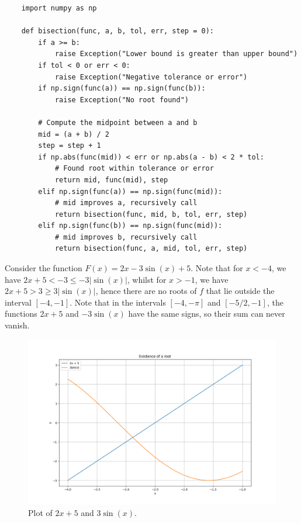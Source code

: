 \documentclass{article}
\begin{document}
\begin{verbatim}
    import numpy as np
        
    def bisection(func, a, b, tol, err, step = 0):
        if a >= b:
            raise Exception("Lower bound is greater than upper bound")
        if tol < 0 or err < 0:
            raise Exception("Negative tolerance or error")
        if np.sign(func(a)) == np.sign(func(b)):
            raise Exception("No root found")
            
        # Compute the midpoint between a and b
        mid = (a + b) / 2
        step = step + 1
        if np.abs(func(mid)) < err or np.abs(a - b) < 2 * tol:
            # Found root within tolerance or error
            return mid, func(mid), step
        elif np.sign(func(a)) == np.sign(func(mid)):
            # mid improves a, recursively call
            return bisection(func, mid, b, tol, err, step)
        elif np.sign(func(b)) == np.sign(func(mid)):
            # mid improves b, recursively call
            return bisection(func, a, mid, tol, err, step)
\end{verbatim}

Consider the function \(F(x) = 2x - 3\sin(x) + 5\). Note that for \(x < -4\), we have \(2x + 5 < -3 \leq -3|\sin(x)|\), whilst for \(x > - 1\), we have \(2x + 5 > 3 \geq 3|\sin(x)|\), hence there are no roots of \(f\) that lie outside the interval \([-4, -1]\). Note that in the intervals \([-4, -\pi]\) and \([-5/2, -1]\), the functions \(2x + 5\) and \(-3\sin(x)\) have the same signs, so their sum can never vanish. 

\begin{figure}
    \centering
    \includegraphics[width=1.0\linewidth]{root_intersect.png}
    \caption{Plot of \(2x+5\) and \(3\sin(x)\).}
\end{figure}
\end{document}
